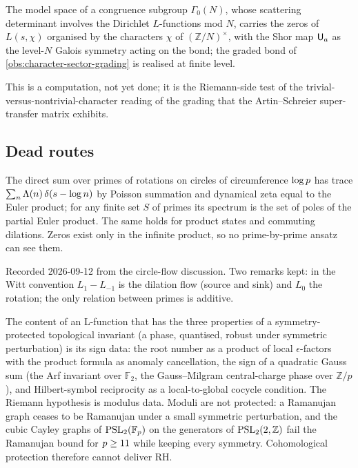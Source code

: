 \begin{conjecture}
\label{conj:galois-graded-bond}
The model space of a congruence subgroup $\Gamma_0(N)$, whose scattering determinant
involves the Dirichlet $L$-functions mod $N$, carries the zeros of $L(s,\chi)$ organised
by the characters $\chi$ of $(\mathbb Z/N)^\times$, with the Shor map $\mathsf U_{a}$ as the
level-$N$ Galois symmetry acting on the bond; the graded bond of
\cref{obs:character-sector-grading} is realised at finite level.
\end{conjecture}

This is a computation, not yet done; it is the Riemann-side test of the
trivial-versus-nontrivial-character reading of the grading that the Artin--Schreier
super-transfer matrix exhibits.

\subsection{Dead routes}

\begin{observation}
\label{obs:prime-by-prime-blind}
The direct sum over primes of rotations on circles of circumference $\log p$
has trace $\sum_n\Lambda(n)\,\delta(s-\log n)$ by Poisson summation and
dynamical zeta equal to the Euler product; for any finite set $S$ of primes
its spectrum is the set of poles of the partial Euler product. The same holds
for product states and commuting dilations. Zeros exist only in the infinite
product, so no prime-by-prime ansatz can see them.
\end{observation}

Recorded 2026-09-12 from the circle-flow discussion. Two remarks kept: in the
Witt convention $L_1 - L_{-1}$ is the dilation flow (source and sink) and
$L_0$ the rotation; the only relation between primes is additive.

\begin{observation}
\label{obs:spt-protection-is-sign-data}
The content of an L-function that has the three properties of a
symmetry-protected topological invariant (a phase, quantised, robust under
symmetric perturbation) is its sign data: the root number as a product of
local $\epsilon$-factors with the product formula as anomaly cancellation,
the sign of a quadratic Gauss sum (the Arf invariant over $\mathbb F_2$, the
Gauss--Milgram central-charge phase over $\mathbb Z/p$), and Hilbert-symbol
reciprocity as a local-to-global cocycle condition. The Riemann hypothesis is
modulus data. Moduli are not protected: a Ramanujan graph ceases to be
Ramanujan under a small symmetric perturbation, and the cubic Cayley graphs
of $\mathrm{PSL}_2(\mathbb F_p)$ on the generators of $\mathrm{PSL}_2(2,\mathbb Z)$ fail the Ramanujan
bound for $p\ge 11$ while keeping every symmetry. Cohomological protection
therefore cannot deliver RH.
\end{observation}

